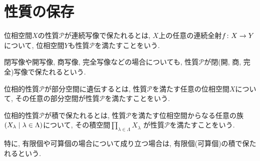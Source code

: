 \documentclass[uplatex, dvipdfmx, a4paper, 12pt, class=jsbook, crop=false]{standalone}
\begin{document}
\section{性質の保存}
\label{sec:preservation-of-properties}

\begin{definition}
	位相空間$ X $の性質$ {\mathcal P} $が連続写像で保たれるとは,
	$ X $上の任意の連続全射$ f\colon X\to Y $について,
	位相空間$ Y $も性質$ {\mathcal P} $を満たすことをいう.
\end{definition}
閉写像や開写像, 商写像, 完全写像などの場合についても,
性質$ \mathcal{P} $が閉(開, 商, 完全)写像で保たれるという.

\begin{definition}
	位相的性質$ \mathcal{P} $が部分空間に遺伝するとは,
	性質$ \mathcal{P} $を満たす任意の位相空間$ X $について,
	その任意の部分空間が性質$ \mathcal{P} $を満たすことをいう.
\end{definition}

\begin{definition}
	位相的性質$ \mathcal{P} $が積で保たれるとは,
	性質$ \mathcal{P} $を満たす位相空間からなる任意の族
	$ \setfamily{X_\lambda}{\lambda \in \Lambda} $について,
	その積空間$ \prod_{\lambda \in \Lambda}  X_\lambda $
	が性質$ \mathcal{P} $を満たすことをいう.
\end{definition}
特に, 有限個や可算個の場合について成り立つ場合は,
有限個(可算個)の積で保たれるという.
\end{document}
